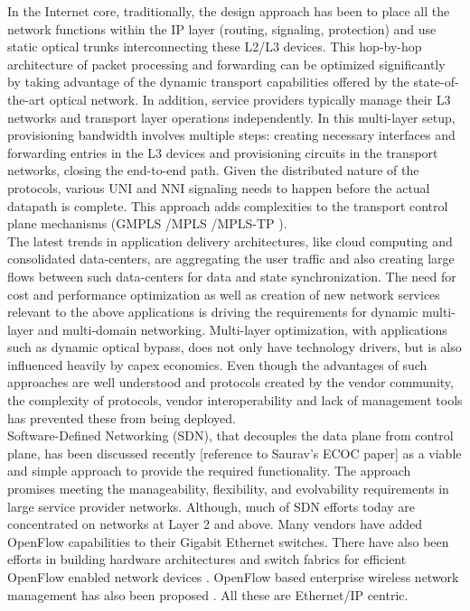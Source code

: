 \documentclass{sig-alternate-10pt}
\begin{document}
	
	 In the Internet core, traditionally, the design approach has been to place all the network functions within the IP layer
	(routing, signaling, protection) and use static optical trunks interconnecting these L2/L3 devices. This hop-by-hop architecture of packet processing and forwarding can be optimized significantly by taking advantage of the dynamic transport capabilities offered by the state-of-the-art optical network.  In addition, service providers 
	typically manage their L3 networks and transport layer operations independently. In this multi-layer setup, provisioning bandwidth involves multiple
	steps: creating necessary interfaces and forwarding entries in the L3 devices and provisioning circuits
	in the transport networks, closing the end-to-end path. Given the distributed nature of the protocols,
	various UNI and NNI signaling needs to happen before the actual datapath is complete. This approach adds
	complexities to the transport control plane mechanisms (GMPLS \cite{gmpls}/MPLS \cite{mpls}/MPLS-TP
	\cite{mpls-tp}). \\
	
	The latest trends in application delivery architectures, like cloud computing and consolidated data-centers, are aggregating the user traffic 
	and also creating large flows between such data-centers for data and state synchronization. The need for cost and performance optimization as well as creation
	of new network services relevant to the above applications is  driving the requirements for dynamic multi-layer and multi-domain networking. Multi-layer optimization,
	with applications such as dynamic optical bypass, does not only have technology drivers, but is also influenced heavily by capex economics. Even though
	the advantages of such approaches are well understood and protocols created by the vendor community, the complexity of protocols, vendor interoperability 
	and lack of management tools has prevented these from being deployed.\\
	
	Software-Defined Networking (SDN), that decouples the data plane from control plane, has been discussed recently [reference to Saurav's ECOC paper] 
	as a viable and simple approach to provide the required functionality. The approach promises meeting the manageability, flexibility, and evolvability 
	requirements in large service provider networks. Although, much of SDN efforts today are concentrated on networks at Layer 2 and above. Many vendors have
	added OpenFlow capabilities to their Gigabit Ethernet switches. There have also been efforts in building
	hardware architectures \cite{Mogul2012} and switch fabrics for efficient OpenFlow enabled network devices
	\cite{Casado2012}. OpenFlow based enterprise wireless network management has also been proposed \cite{Suresh2012}. All these are Ethernet/IP centric.\\
	
\end{document}
